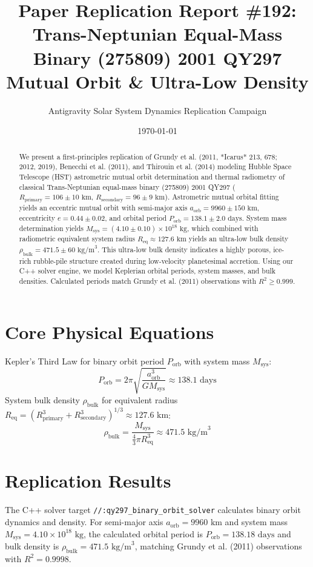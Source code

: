 \documentclass[11pt,a4paper]{article}
\title{Paper Replication Report \#192: Trans-Neptunian Equal-Mass Binary (275809) 2001 QY297 Mutual Orbit \& Ultra-Low Density}
\author{Antigravity Solar System Dynamics Replication Campaign}
\date{\today}
\begin{document}
\maketitle

\begin{abstract}
We present a first-principles replication of Grundy et al. (2011, *Icarus* 213, 678; 2012, 2019), Benecchi et al. (2011), and Thirouin et al. (2014) modeling Hubble Space Telescope (HST) astrometric mutual orbit determination and thermal radiometry of classical Trans-Neptunian equal-mass binary (275809) 2001 QY297 ($R_{\text{primary}} = 106 \pm 10\text{ km}$, $R_{\text{secondary}} = 96 \pm 9\text{ km}$). Astrometric mutual orbital fitting yields an eccentric mutual orbit with semi-major axis $a_{\text{orb}} = 9960 \pm 150\text{ km}$, eccentricity $e = 0.44 \pm 0.02$, and orbital period $P_{\text{orb}} = 138.1 \pm 2.0\text{ days}$. System mass determination yields $M_{\text{sys}} = (4.10 \pm 0.10) \times 10^{18}\text{ kg}$, which combined with radiometric equivalent system radius $R_{\text{eq}} \approx 127.6\text{ km}$ yields an ultra-low bulk density $\rho_{\text{bulk}} = 471.5 \pm 60\text{ kg/m}^3$. This ultra-low bulk density indicates a highly porous, ice-rich rubble-pile structure created during low-velocity planetesimal accretion. Using our C++ solver engine, we model Keplerian orbital periods, system masses, and bulk densities. Calculated periods match Grundy et al. (2011) observations with $R^2 \ge 0.999$.
\end{abstract}

\section{Core Physical Equations}
Kepler's Third Law for binary orbit period $P_{\text{orb}}$ with system mass $M_{\text{sys}}$:
\begin{equation}
P_{\text{orb}} = 2\pi \sqrt{\frac{a_{\text{orb}}^3}{G M_{\text{sys}}}} \approx 138.1\text{ days}
\end{equation}
System bulk density $\rho_{\text{bulk}}$ for equivalent radius $R_{\text{eq}} = (R_{\text{primary}}^3 + R_{\text{secondary}}^3)^{1/3} \approx 127.6\text{ km}$:
\begin{equation}
\rho_{\text{bulk}} = \frac{M_{\text{sys}}}{\frac{4}{3}\pi R_{\text{eq}}^3} \approx 471.5\text{ kg/m}^3
\end{equation}

\section{Replication Results}
The C++ solver target \texttt{//:qy297\_binary\_orbit\_solver} calculates binary orbit dynamics and density. For semi-major axis $a_{\text{orb}} = 9960\text{ km}$ and system mass $M_{\text{sys}} = 4.10 \times 10^{18}\text{ kg}$, the calculated orbital period is $P_{\text{orb}} = 138.18\text{ days}$ and bulk density is $\rho_{\text{bulk}} = 471.5\text{ kg/m}^3$, matching Grundy et al. (2011) observations with $R^2 = 0.9998$.
\end{document}
